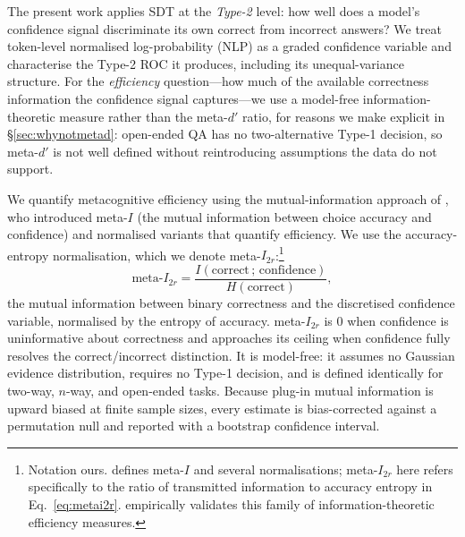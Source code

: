 \documentclass{article}
\begin{document}
The present work applies SDT at the \emph{Type-2} level: how well does a model's confidence signal discriminate its own correct from incorrect answers? We treat token-level normalised log-probability (NLP) as a graded confidence variable and characterise the Type-2 ROC it produces, including its unequal-variance structure. For the \emph{efficiency} question---how much of the available correctness information the confidence signal captures---we use a model-free information-theoretic measure rather than the meta-$d'$ ratio, for reasons we make explicit in \S\ref{sec:whynotmetad}: open-ended QA has no two-alternative Type-1 decision, so meta-$d'$ is not well defined without reintroducing assumptions the data do not support.

We quantify metacognitive efficiency using the mutual-information approach of \citet{dayan2023metacognitive}, who introduced meta-$I$ (the mutual information between choice accuracy and confidence) and normalised variants that quantify efficiency. We use the accuracy-entropy normalisation, which we denote meta-$I_{2r}$:\footnote{Notation ours. \citet{dayan2023metacognitive} defines meta-$I$ and several normalisations; meta-$I_{2r}$ here refers specifically to the ratio of transmitted information to accuracy entropy in Eq.~\ref{eq:metai2r}. \citet{fitousi2025information} empirically validates this family of information-theoretic efficiency measures.}
\begin{equation}
\text{meta-}I_{2r} = \frac{I(\text{correct}\,;\,\text{confidence})}{H(\text{correct})},
\label{eq:metai2r}
\end{equation}
the mutual information between binary correctness and the discretised confidence variable, normalised by the entropy of accuracy. meta-$I_{2r}$ is 0 when confidence is uninformative about correctness and approaches its ceiling when confidence fully resolves the correct/incorrect distinction. It is model-free: it assumes no Gaussian evidence distribution, requires no Type-1 decision, and is defined identically for two-way, $n$-way, and open-ended tasks. Because plug-in mutual information is upward biased at finite sample sizes, every estimate is bias-corrected against a permutation null and reported with a bootstrap confidence interval.
\end{document}
